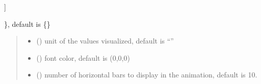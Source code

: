 \documentclass[letterpaper,10pt,english]{sphinxmanual}
\begin{document}
\begin{fulllineitems}
\begin{description}
\begin{description}
\begin{description}
\end{description}

\sphinxAtStartPar
{]}

\end{description}

\sphinxAtStartPar
\}, default is \{\}

\end{description}
\begin{quote}\begin{description}
\begin{itemize}
\item {} 
\sphinxAtStartPar
{} () \textendash{} unit of the values visualized, default is “”

\item {} 
\sphinxAtStartPar
{} () \textendash{} font color, default is (0,0,0)

\item {} 
\sphinxAtStartPar
{} () \textendash{} number of horizontal bars to display in the animation, default is 10.

\end{itemize}

\end{description}\end{quote}

\begin{fulllineitems}
\label{\detokenize{index:sjvisualizer.StackedBarChart.stacked_bar_chart.draw}}
\pysigstartsignatures
{}
\pysigstopsignatures
\end{fulllineitems}


\begin{fulllineitems}
\label{\detokenize{index:sjvisualizer.StackedBarChart.stacked_bar_chart.draw_y_ticks}}
\pysigstartsignatures
{}
\pysigstopsignatures
\end{fulllineitems}


\end{fulllineitems}
\end{document}
